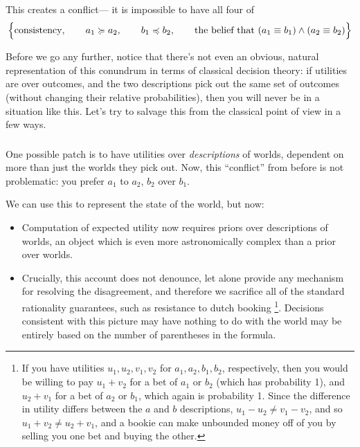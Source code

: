 \documentclass{article}
\begin{document}
	This creates a conflict--- it is impossible to have all four of
	\[ \Big\{\text{consistency},\qquad a_1 \succcurlyeq a_2,\qquad b_1 \preccurlyeq b_2,\qquad\text{the belief that}~(a_1 \equiv b_1) \land( a_2 \equiv b_2)\Big\}\]
	
	Before we go any further, notice that there's not even an obvious, natural representation of this conundrum in terms of classical decision theory: if utilities are over outcomes, and the two descriptions pick out the same set of outcomes (without changing their relative probabilities), then you will never be in a situation like this. Let's try to salvage this from the classical point of view in a few ways.
	
	\subsubsection{}
	One possible patch is to have utilities over \textit{descriptions} of worlds, dependent on more than just the worlds they pick out. Now, this ``conflict'' from before is not problematic: you prefer $a_1$ to $a_2$, $b_2$ over $b_1$. 
	
	We can use this to represent the state of the world, but now:
	\begin{itemize}%
		\item Computation of expected utility now requires priors over descriptions of worlds, an object which is even more astronomically complex than a prior over worlds. %
		
		\item Crucially, this account does not denounce, let alone provide any mechanism for resolving the disagreement, and therefore we sacrifice all of the standard rationality guarantees, such as resistance to dutch booking%
			\footnote{If you have utilities $u_1, u_2, v_1, v_2$ for $a_1, a_2, b_1, b_2$, respectively, then you would be willing to pay $u_1 + v_2$ for a bet of $a_1$ or $b_2$ (which has probability 1), and $u_2 + v_1$ for a bet of $a_2$ or $b_1$, which again is probability 1. Since the difference in utility differs between the $a$ and $b$ descriptions, $u_1 - u_2 \neq v_1 - v_2$, and so  $u_1 + v_2 \neq u_2 + v_1$, and a bookie can make unbounded money off of you by selling you one bet and buying the other.}.
		Decisions consistent with this picture may have nothing to do with the world may be entirely based on the number of parentheses in the formula.
	\end{itemize}
\end{document}
